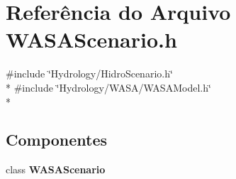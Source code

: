 \section{Referência do Arquivo W\+A\+S\+A\+Scenario.\+h}
\label{_w_a_s_a_scenario_8h}
{\ttfamily \#include \char`\"{}Hydrology/\+Hidro\+Scenario.\+h\char`\"{}}\\*
{\ttfamily \#include \char`\"{}Hydrology/\+W\+A\+S\+A/\+W\+A\+S\+A\+Model.\+h\char`\"{}}\\*
\subsection*{Componentes}
\begin{DoxyCompactItemize}
\item 
class {\bf W\+A\+S\+A\+Scenario}
\end{DoxyCompactItemize}
